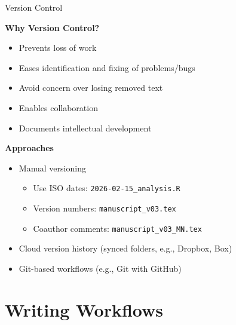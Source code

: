 \documentclass{beamer}
\begin{document}
\begin{frame}{Version Control}

\textbf{Why Version Control?}
\begin{itemize}
    \item Prevents loss of work
    \item Eases identification and fixing of problems/bugs
    \item Avoid concern over losing removed text
    \item Enables collaboration
    \item Documents intellectual development
\end{itemize}


\textbf{Approaches}
\begin{itemize}
    \item Manual versioning 
        \begin{itemize}
            \item Use ISO dates: \texttt{2026-02-15\_analysis.R}
            \item Version numbers: \texttt{manuscript\_v03.tex}
            \item Coauthor comments: \texttt{manuscript\_v03\_MN.tex}
        \end{itemize}
    \item Cloud version history (synced folders, e.g., Dropbox, Box)
    \item Git-based workflows (e.g., Git with GitHub)
\end{itemize}


\end{frame}

\section{Writing Workflows}
\end{document}
